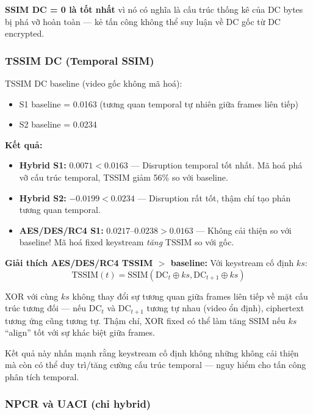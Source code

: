 \textbf{SSIM DC = 0 là tốt nhất} vì nó có nghĩa là cấu trúc thống kê của DC bytes
bị phá vỡ hoàn toàn --- kẻ tấn công không thể suy luận về DC gốc từ DC encrypted.

\subsubsection{TSSIM DC (Temporal SSIM)}

TSSIM DC baseline (video gốc không mã hoá):
\begin{itemize}
  \item S1 baseline = 0.0163 (tương quan temporal tự nhiên giữa frames liên tiếp)
  \item S2 baseline = 0.0234
\end{itemize}

\textbf{Kết quả:}
\begin{itemize}
  \item \textbf{Hybrid S1:} $0.0071 < 0.0163$ --- Disruption temporal tốt nhất.
        Mã hoá phá vỡ cấu trúc temporal, TSSIM giảm 56\% so với baseline.
  \item \textbf{Hybrid S2:} $-0.0199 < 0.0234$ --- Disruption rất tốt,
        thậm chí tạo phản tương quan temporal.
  \item \textbf{AES/DES/RC4 S1:} $0.0217$--$0.0238 > 0.0163$ --- Không cải thiện
        so với baseline! Mã hoá fixed keystream \emph{tăng} TSSIM so với gốc.
\end{itemize}

\textbf{Giải thích AES/DES/RC4 TSSIM $>$ baseline:}
Với keystream cố định $ks$:
\begin{equation}
\text{TSSIM}(t) = \text{SSIM}(\text{DC}_t \oplus ks, \text{DC}_{t+1} \oplus ks)
\end{equation}

XOR với cùng $ks$ không thay đổi sự tương quan giữa frames liên tiếp về mặt
cấu trúc tương đối --- nếu $\text{DC}_t$ và $\text{DC}_{t+1}$ tương tự nhau
(video ổn định), ciphertext tương ứng cũng tương tự. Thậm chí, XOR fixed có thể
làm tăng SSIM nếu $ks$ ``align'' tốt với sự khác biệt giữa frames.

Kết quả này nhấn mạnh rằng keystream cố định không những không cải thiện mà còn
có thể duy trì/tăng cường cấu trúc temporal --- nguy hiểm cho tấn công phân tích
temporal.

\subsubsection{NPCR và UACI (chỉ hybrid)}

